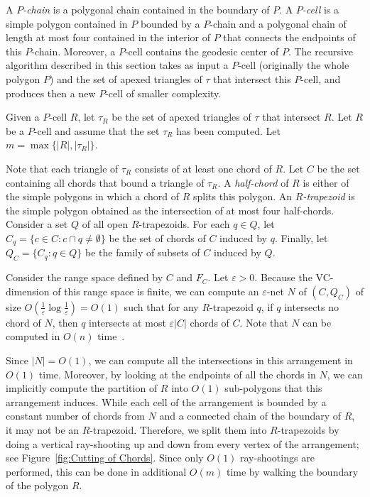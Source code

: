\documentclass[a4paper,UKenglish]{lipics}
\begin{document}
A \emph{$P$-chain} is a polygonal chain contained in the boundary of $P$.
A \emph{$P$-cell} is a simple polygon contained in $P$ bounded by a $P$-chain and a polygonal chain of length at most four contained in the interior of $P$ that connects the endpoints of this $P$-chain. Moreover, a $P$-cell contains the geodesic center of $P$.
The recursive algorithm described in this section takes as input a $P$-cell (originally the whole polygon $P$) and the set of apexed triangles of $\tau$ that intersect this $P$-cell, and produces then a new $P$-cell of smaller complexity.

Given a $P$-cell $R$, let $\tau_R$ be the set of apexed triangles of $\tau$ that intersect $R$.
Let $R$ be a $P$-cell and assume that the set $\tau_R$ has been computed.
Let $m = \max\{|R|, |\tau_R|\}$.

Note that each triangle of $\tau_R$ consists of at least one chord of $R$.
Let $C$ be the set containing all chords that bound a triangle of $\tau_R$. 
A \emph{half-chord} of $R$ is either of the simple polygons in which a chord of $R$ splits this polygon.
An \emph{$R$-trapezoid} is the simple polygon obtained as the intersection of at most four half-chords.
Consider a set $Q$ of all open $R$-trapezoids. 
For each $q\in Q$, let $C_q = \{c\in C: c\cap q \neq \emptyset\}$ be the set of chords of $C$ induced by $q$. 
Finally, let $Q_C = \{C_q : q\in Q\}$ be the family of subsets of $C$ induced by $Q$.

Consider the range space defined by $C$ and $F_C$. 
Let $\varepsilon >0$.
Because the VC-dimension of this range space is finite, we can compute an $\varepsilon$-net $N$ of $(C, Q_C)$ of size $O(\frac{1}{\varepsilon} \log \frac{1}{\varepsilon}) = O(1)$ such that for any $R$-trapezoid $q$, if $q$ intersects no chord of $N$, then $q$ intersects at most $\varepsilon |C|$ chords of $C$. Note that $N$ can be computed in $O(n)$ time~\cite{ConstructionEpsilonNets}. 

Since $|N| = O(1)$, we can compute all the intersections in this arrangement in $O(1)$ time. 
Moreover, by looking at the endpoints of all the chords in $N$, 
we can implicitly compute the partition of $R$ into $O(1)$ sub-polygons that this arrangement induces.
While each cell of the arrangement is bounded by a constant number of chords from $N$ and a connected chain of the boundary of $R$, it may not be an $R$-trapezoid. Therefore, we split them into $R$-trapezoids by doing a vertical ray-shooting up and down from every vertex of the arrangement; see Figure~\ref{fig:Cutting of Chords}. 
Since only $O(1)$ ray-shootings are performed, this can be done in additional $O(m)$ time by walking the boundary of the polygon $R$.
\end{document}
